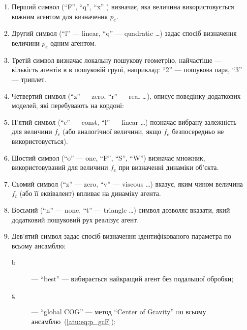 \documentclass[a4paper,13pt]{atuaref}
\begin{document}
\begin{enumerate}

  \item
  Перший символ (``F'', ``q'', ``x'' ) визначає,
  яка величина використовується кожним агентом для визначення $ p_e $.

  \item

    Другий символ (``l'' --- linear, ``q'' --- quadratic \ldots ) задає спосіб визначення величини $ p_e $ одним агентом.

  \item
  Третій символ визначає локальну пошукову геометрію, найчастіше --- кількість
    агентів в в пошуковій групі, наприклад: ``2'' --- пошукова пара, ``3'' --- триплет.

  \item
    Четвертий символ (``z'' --- zero, ``r'' --- real \ldots),
    описує поведінку додаткових моделей, які перебувають на кордоні:

  \item
    П'ятий символ (``c'' --- const, ``l'' --- linear \ldots )
    позначає вибрану залежність для величини $ f_e $ (або
    аналогічної величини, якщо $ f_e $ безпосередньо не використовується).

  \item
    Шостий символ (``o'' --- one, ``F'', ``S'', ``W'') визначає множник,
    використовуваний для величини $ f_e $ при визначенні динаміки об'єкта.

  \item
   Сьомий символ (``z'' --- zero, ``v'' --- viscous \ldots)
    вказує, яким чином величина $ f_t $ (або її еквівалент) впливає на динаміку агента.

  \item
   Восьмий (``n'' --- none, ``t'' --- triangle \ldots ) символ дозволяє вказати, який додатковий пошуковий рух реалізує агент.

  \item
    Дев'ятий символ задає спосіб визначення ідентифікованого параметра по всьому ансамблю:
    \begin{description}

      \item[b]  --- ``best''
        --- вибирається найкращий агент без подальшої обробки;

      \item[g]  --- ``global COG'' ---
        метод ``Center of Gravity'' по всьому ансамблю~(\ref{atu:eq:p_gcF});


\end{description}
\end{enumerate}
\end{document}
